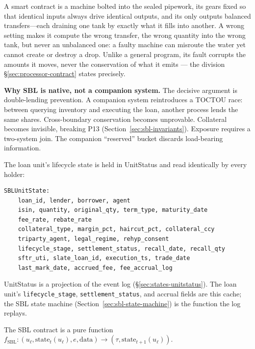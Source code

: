 \begin{mentalmodel}
A smart contract is a machine bolted into the sealed pipework, its gears fixed so that identical inputs always drive identical outputs, and its only outputs balanced transfers---each draining one tank by exactly what it fills into another. A wrong setting makes it compute the wrong transfer, the wrong quantity into the wrong tank, but never an unbalanced one: a faulty machine can misroute the water yet cannot create or destroy a drop. Unlike a general program, its fault corrupts the amounts it moves, never the conservation of what it emits --- the division \S\ref{sec:processor-contract} states precisely.
\end{mentalmodel}

\noindent\textbf{Why SBL is native, not a companion system.} The decisive argument is double-lending prevention. A companion system reintroduces a TOCTOU race: between querying inventory and executing the loan, another process lends the same shares. Cross-boundary conservation becomes unprovable. Collateral becomes invisible, breaking P13 (Section~\ref{sec:sbl-invariants}). Exposure requires a two-system join. The companion ``reserved'' bucket discards load-bearing information.

The loan unit's lifecycle state is held in UnitStatus and read identically by every holder:

\begin{lstlisting}
SBLUnitState:
    loan_id, lender, borrower, agent
    isin, quantity, original_qty, term_type, maturity_date
    fee_rate, rebate_rate
    collateral_type, margin_pct, haircut_pct, collateral_ccy
    triparty_agent, legal_regime, rehyp_consent
    lifecycle_stage, settlement_status, recall_date, recall_qty
    sftr_uti, slate_loan_id, execution_ts, trade_date
    last_mark_date, accrued_fee, fee_accrual_log
\end{lstlisting}

\begin{remark}
UnitStatus is a projection of the event log (\S\ref{sec:states-unitstatus}). The loan unit's \texttt{lifecycle\_stage}, \texttt{settlement\_status}, and accrual fields are this cache; the SBL state machine (Section~\ref{sec:sbl-state-machine}) is the function the log replays.
\end{remark}

\noindent The SBL contract is a pure function $f_{\mathrm{SBL}}:(u_\ell,\mathrm{state}_t(u_\ell),e,\mathrm{data}) \to (\tau,\mathrm{state}_{t+1}(u_\ell))$.

